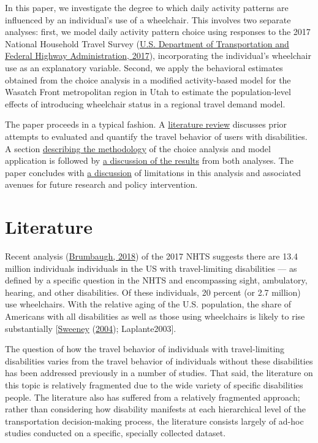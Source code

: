 \documentclass[3p, authoryear, review]{elsarticle} %
\begin{document}
In this paper, we investigate the degree to which daily activity patterns are
influenced by an individual's use of a wheelchair. This involves two separate
analyses: first, we model daily activity pattern choice using responses to the
2017 National Household Travel Survey (\protect\hyperlink{ref-fhwa2017}{U.S. Department of Transportation and Federal Highway Administration, 2017}), incorporating the individual's
wheelchair use as an explanatory variable. Second, we apply the behavioral
estimates obtained from the choice analysis in a modified activity-based model
for the Wasatch Front metropolitan region in Utah to estimate the
population-level effects of introducing wheelchair status in a regional travel
demand model.

The paper proceeds in a typical fashion. A \protect\hyperlink{literature}{literature review}
discusses prior attempts to evaluated and quantify the travel behavior of
users with disabilities. A section \protect\hyperlink{methodology}{describing the methodology}
of the choice analysis and model application is followed by \protect\hyperlink{results}{a discussion of the results}
from both analyses. The paper concludes with \protect\hyperlink{discussion}{a discussion}
of limitations in this analysis and associated avenues for future research and
policy intervention.

\hypertarget{sec-literature}{%
\section{Literature}\label{sec-literature}}

Recent analysis (\protect\hyperlink{ref-Brumbaugh2018}{Brumbaugh, 2018}) of the 2017 NHTS suggests there are 13.4
million individuals individuals in the US with travel-limiting disabilities --- as defined by a
specific question in the NHTS and encompassing sight, ambulatory, hearing, and
other disabilities. Of these individuals, 20 percent (or 2.7
million) use wheelchairs. With the relative aging of the U.S. population, the
share of Americans with all disabilities as well as those using wheelchairs is
likely to rise substantially {[}\protect\hyperlink{ref-Sweeney2004}{Sweeney} (\protect\hyperlink{ref-Sweeney2004}{2004}); Laplante2003{]}.

The question of how the travel behavior of individuals with travel-limiting
disabilities varies from the travel behavior of individuals without these
disabilities has been addressed previously in a number of studies. That said,
the literature on this topic is relatively fragmented due to the wide variety of
specific disabilities people. The literature also has suffered from a relatively
fragmented approach; rather than considering how disability manifests at each
hierarchical level of the transportation decision-making process, the literature
consists largely of ad-hoc studies conducted on a specific, specially collected
dataset.
\end{document}
